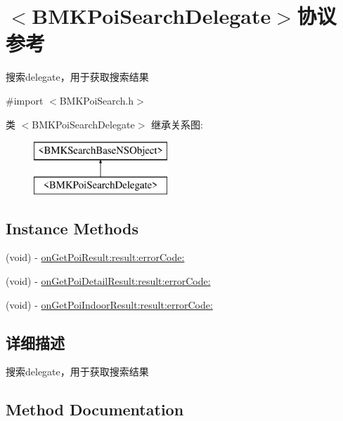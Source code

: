 \hypertarget{protocol_b_m_k_poi_search_delegate-p}{}\section{$<$B\+M\+K\+Poi\+Search\+Delegate$>$协议 参考}
\label{protocol_b_m_k_poi_search_delegate-p}


搜索delegate，用于获取搜索结果  




{\ttfamily \#import $<$B\+M\+K\+Poi\+Search.\+h$>$}

类 $<$B\+M\+K\+Poi\+Search\+Delegate$>$ 继承关系图\+:\begin{figure}[H]
\begin{center}
\leavevmode
\includegraphics[height=2.000000cm]{protocol_b_m_k_poi_search_delegate-p}
\end{center}
\end{figure}
\subsection*{Instance Methods}
\begin{DoxyCompactItemize}
\item 
(void) -\/ \hyperlink{protocol_b_m_k_poi_search_delegate-p_ac37fca8bc7dc97af6e2eccdf5c17bcf7}{on\+Get\+Poi\+Result\+:result\+:error\+Code\+:}
\item 
(void) -\/ \hyperlink{protocol_b_m_k_poi_search_delegate-p_a510274f805b822e918ed2d1374577b8b}{on\+Get\+Poi\+Detail\+Result\+:result\+:error\+Code\+:}
\item 
(void) -\/ \hyperlink{protocol_b_m_k_poi_search_delegate-p_a01a8e8a58b7d958c66e048db693d9fe4}{on\+Get\+Poi\+Indoor\+Result\+:result\+:error\+Code\+:}
\end{DoxyCompactItemize}


\subsection{详细描述}
搜索delegate，用于获取搜索结果 

\subsection{Method Documentation}
\hypertarget{protocol_b_m_k_poi_search_delegate-p_a510274f805b822e918ed2d1374577b8b}{}
